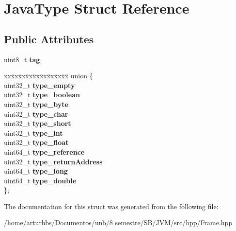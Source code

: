 \hypertarget{structJavaType}{}\section{Java\+Type Struct Reference}
\label{structJavaType}
\subsection*{Public Attributes}
\begin{DoxyCompactItemize}
\item 
uint8\+\_\+t {\bfseries tag}\hypertarget{structJavaType_a1f53e5f39b5665033e70d1b56e4101d1}{}\label{structJavaType_a1f53e5f39b5665033e70d1b56e4101d1}

\item 
\begin{tabbing}
xx\=xx\=xx\=xx\=xx\=xx\=xx\=xx\=xx\=\kill
union \{\\
\>uint32\_t {\bfseries type\_empty}\\
\>uint32\_t {\bfseries type\_boolean}\\
\>uint32\_t {\bfseries type\_byte}\\
\>uint32\_t {\bfseries type\_char}\\
\>uint32\_t {\bfseries type\_short}\\
\>uint32\_t {\bfseries type\_int}\\
\>uint32\_t {\bfseries type\_float}\\
\>uint64\_t {\bfseries type\_reference}\\
\>uint32\_t {\bfseries type\_returnAddress}\\
\>uint64\_t {\bfseries type\_long}\\
\>uint64\_t {\bfseries type\_double}\\
\}; \hypertarget{structJavaType_aac519cb72d6be70c0fbea8b5ba1bd150}{}\label{structJavaType_aac519cb72d6be70c0fbea8b5ba1bd150}
\\

\end{tabbing}\end{DoxyCompactItemize}


The documentation for this struct was generated from the following file\+:\begin{DoxyCompactItemize}
\item 
/home/arturhbs/\+Documentos/unb/8 semestre/\+S\+B/\+J\+V\+M/src/hpp/Frame.\+hpp\end{DoxyCompactItemize}
